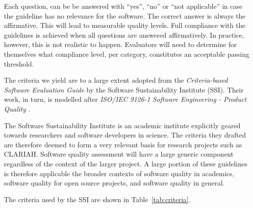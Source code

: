 \documentclass[a4paper,11pt]{article}
\begin{document}
Each question, can be be answered with ``yes'', ``no'' or ``not applicable'' in
case the guideline has no relevance for the software. The correct answer is
always the affirmative. This will lead to measurable quality levels. Full
compliance with the guidelines is achieved when all questions are answered
affirmatively.  In practice, however, this is not realistic to happen.
Evaluators will need to determine for themselves what compliance level, per
category, constitutes an acceptable passing threshold.

The criteria we yield are  to a large extent adopted from the
\emph{Criteria-based Software Evaluation Guide} \citep{SSIGUIDE} by the Software
Sustainability Institute (SSI). Their work, in turn, is modelled after
\emph{ISO/IEC 9126-1 Software Engineering - Product Quality} \citep{ISO9126}.
%
%
%

The Software Sustainability Institute\citep{SSIGENERAL} is an academic institute
explicitly geared towards researchers and software developers in science. The
criteria they drafted are therefore deemed to form a very relevant basis for
research projects such as CLARIAH. Software quality assessment will have a
large generic component regardless of the context of the larger project. A
large portion of these guidelines is therefore applicable the broader contexts
of software quality in academics, software quality for open source projects, and
software quality in general.

The criteria used by the SSI are shown in Table~\ref{tab:criteria}.
\end{document}
